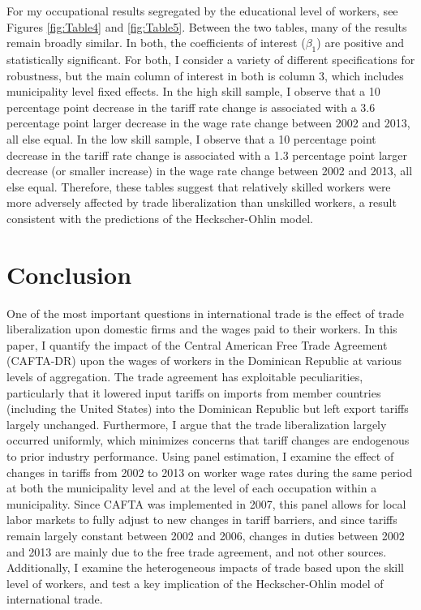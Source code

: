 \documentclass[12pt]{article}
\begin{document}
For my occupational results segregated by the educational level of workers, see Figures \ref{fig:Table4}
and \ref{fig:Table5}. Between the two tables, many of the results remain broadly similar. In both,
the coefficients of interest ($\beta_1$) are positive and statistically significant. For both,
I consider a variety of different specifications for robustness, but the main column of interest
in both is column 3, which includes municipality level fixed effects. In the high skill sample,
I observe that a 10 percentage point decrease in the tariff 
rate change is associated with a 3.6 percentage point larger decrease in the wage rate change between 
2002 and 2013, all else equal. In the low skill sample,
I observe that a 10 percentage point decrease in the tariff 
rate change is associated with a 1.3 percentage point larger decrease (or smaller increase) 
in the wage rate change between 2002 and 2013, all else equal. Therefore, these tables suggest
that relatively skilled workers were more adversely affected by trade liberalization than unskilled
workers, a result consistent with the predictions of the Heckscher-Ohlin model.

\vspace{-10pt}
\section{Conclusion}
\label{sec:Conclusion}

One of the most important questions in international trade is the effect of trade liberalization
upon domestic firms and the wages paid to their workers. In this paper, I quantify the impact of 
the Central American Free Trade Agreement (CAFTA-DR) upon the wages of workers in the Dominican 
Republic at various levels of aggregation. The trade agreement has exploitable peculiarities, 
particularly that it lowered input tariffs on imports from member countries (including the United States) 
into the Dominican Republic but left export tariffs largely unchanged. Furthermore, I argue that 
the trade liberalization largely occurred uniformly, which minimizes concerns that tariff changes
are endogenous to prior industry performance. Using panel estimation, I examine the effect
of changes in tariffs from 2002 to 2013 on worker wage rates during the same period at both the 
municipality level and at the level of each occupation within a municipality. 
Since CAFTA was implemented in 2007, this panel allows for local labor markets to fully adjust 
to new changes in tariff barriers, and since tariffs remain largely constant between 2002 and 2006, 
changes in duties between 2002 and 2013 are mainly due to the free trade agreement, and not other 
sources. Additionally, I examine the heterogeneous impacts of trade based upon the skill level of 
workers, and test a key implication of the Heckscher-Ohlin model of international trade. 
\end{document}
